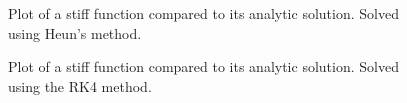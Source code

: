 \documentclass[twocolumn,11pt]{article}
\begin{document}
\begin{figure}[!h]
	\centering
	\noindent
      \caption{Plot of a stiff function compared to its analytic solution. Solved using Heun's method.}
\end{figure}

\begin{figure}[!h]
	\centering
	\noindent
      \caption{Plot of a stiff function compared to its analytic solution. Solved using the RK4 method.}
\end{figure}
\end{document}
